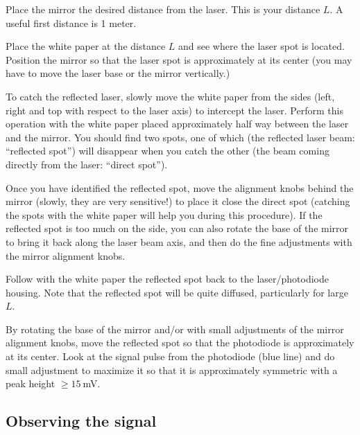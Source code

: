 \begin{steps}
	\item Place the mirror the desired distance from the laser. This is your distance $L$. A useful first distance is 1 meter.
	
	\item Place the white paper at the distance $L$ and see where the laser spot is located. Position the mirror so that the laser spot is approximately at its center (you may have to move the laser base or the mirror vertically.)
	
	\item To catch the reflected laser, slowly move the white paper from the sides (left, right and top with respect to the laser axis) to intercept the laser. Perform this operation with the white paper placed approximately half way between the laser and the mirror. You should find two spots, one of which (the reflected laser beam: “reflected spot”) will disappear when you catch the other (the beam coming directly from the laser: “direct spot”).
	
	\item Once you have identified the reflected spot, move the alignment knobs behind the mirror (slowly, they are very sensitive!) to place it close the direct spot (catching the spots with the white paper will help you during this procedure).  If the reflected spot is too much on the side, you can also rotate the base of the mirror to bring it back along the laser beam axis, and then do the fine adjustments with the mirror alignment knobs.
	
	\item Follow with the white paper the reflected spot back to the laser/photodiode housing. Note that the reflected spot will be quite diffused, particularly for large $L$.
	
	\item By rotating the base of the mirror and/or with small adjustments of the mirror alignment knobs, move the reflected spot so that the photodiode is approximately at its center.  Look at the signal pulse from the photodiode (blue line) and do small adjustment to maximize it so that it is approximately symmetric with a peak height $\ge 15\:$mV.

\end{steps}

\subsection{Observing the signal}

